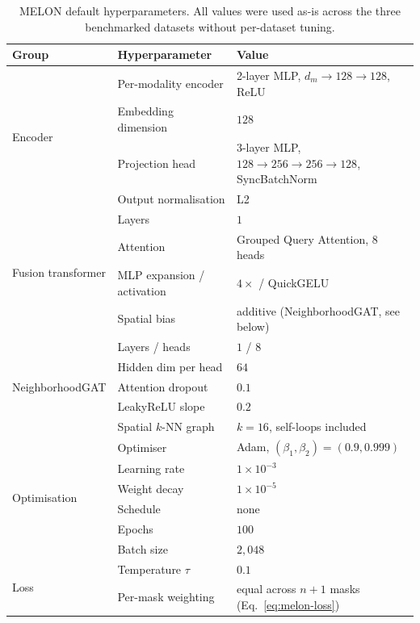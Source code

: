 \documentclass{article}
\theoremstyle{plain}
\theoremstyle{definition}
\begin{document}
\begin{table}[H]
\centering
\caption{MELON default hyperparameters. All values were used as-is across the three benchmarked datasets without per-dataset tuning.}
\label{tab:hyperparams}
\small
\begin{tabular}{lll}
\toprule
Group & Hyperparameter & Value \\
\midrule
\multirow{4}{*}{Encoder}
  & Per-modality encoder      & 2-layer MLP, $d_m \!\rightarrow\! 128 \!\rightarrow\! 128$, ReLU \\
  & Embedding dimension       & $128$ \\
  & Projection head           & 3-layer MLP, $128\!\rightarrow\!256\!\rightarrow\!256\!\rightarrow\!128$, SyncBatchNorm \\
  & Output normalisation      & L2 \\
\midrule
\multirow{4}{*}{Fusion transformer}
  & Layers                    & $1$ \\
  & Attention                 & Grouped Query Attention, $8$ heads \\
  & MLP expansion / activation& $4\times$ / QuickGELU \\
  & Spatial bias              & additive (NeighborhoodGAT, see below) \\
\midrule
\multirow{5}{*}{NeighborhoodGAT}
  & Layers / heads            & $1$ / $8$ \\
  & Hidden dim per head       & $64$ \\
  & Attention dropout         & $0.1$ \\
  & LeakyReLU slope           & $0.2$ \\
  & Spatial $k$-NN graph      & $k=16$, self-loops included \\
\midrule
\multirow{6}{*}{Optimisation}
  & Optimiser                 & Adam, $(\beta_1,\beta_2)=(0.9,0.999)$ \\
  & Learning rate             & $1\!\times\!10^{-3}$ \\
  & Weight decay              & $1\!\times\!10^{-5}$ \\
  & Schedule                  & none \\
  & Epochs                    & $100$ \\
  & Batch size                & $2{,}048$ \\
\midrule
\multirow{2}{*}{Loss}
  & Temperature $\tau$        & $0.1$ \\
  & Per-mask weighting        & equal across $n{+}1$ masks (Eq.~\ref{eq:melon-loss}) \\

\end{tabular}
\end{table}
\end{document}
